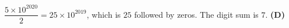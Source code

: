 $\dfrac{5\times10^{2020}}2=25\times10^{2019}$, which is $25$ followed by zeros. The digit sum is $7$. \textbf{(D)}
